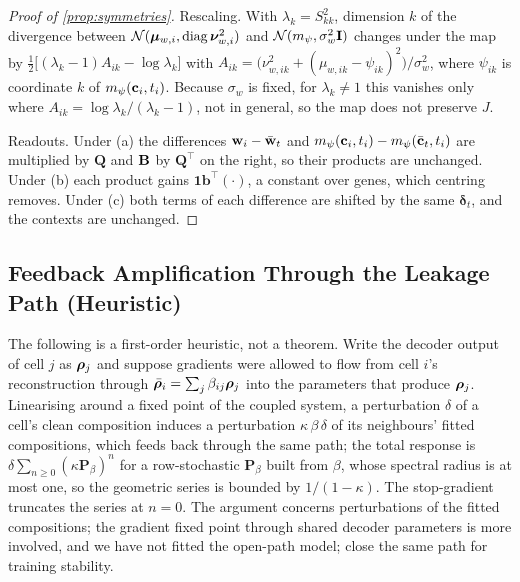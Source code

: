 \begin{proof}[Proof of \cref{prop:symmetries}]
Rescaling. With $\lambda_k = S_{kk}^2$, dimension $k$ of the divergence between $\mathcal{N}(\boldsymbol{\mu}_{w,i}, \operatorname{diag}\boldsymbol{\nu}_{w,i}^2)$ and $\mathcal{N}(m_{\psi}, \sigma_w^2\mathbf{I})$ changes under the map by $\tfrac12\big[(\lambda_k - 1)A_{ik} - \log\lambda_k\big]$ with $A_{ik} = \big(\nu_{w,ik}^2 + (\mu_{w,ik} - \psi_{ik})^2\big)/\sigma_w^2$, where $\psi_{ik}$ is coordinate $k$ of $m_{\psi}(\mathbf{c}_i, t_i)$. Because $\sigma_w$ is fixed, for $\lambda_k \neq 1$ this vanishes only where $A_{ik} = \log\lambda_k/(\lambda_k - 1)$, not in general, so the map does not preserve $J$.

Readouts. Under (a) the differences $\mathbf{w}_i - \bar{\mathbf{w}}_t$ and $m_{\psi}(\mathbf{c}_i, t_i) - m_{\psi}(\bar{\mathbf{c}}_t, t_i)$ are multiplied by $\mathbf{Q}$ and $\mathbf{B}$ by $\mathbf{Q}^\top$ on the right, so their products are unchanged. Under (b) each product gains $\mathbf{1}\mathbf{b}^\top(\cdot)$, a constant over genes, which centring removes. Under (c) both terms of each difference are shifted by the same $\boldsymbol{\delta}_t$, and the contexts are unchanged.
\end{proof}

\subsection{Feedback Amplification Through the Leakage Path (Heuristic)}
\label{app:amplification}

The following is a first-order heuristic, not a theorem. Write the decoder output of cell $j$ as $\boldsymbol{\rho}_j$ and suppose gradients were allowed to flow from cell $i$'s reconstruction through $\bar{\boldsymbol{\rho}}_i = \sum_j \beta_{ij}\boldsymbol{\rho}_j$ into the parameters that produce $\boldsymbol{\rho}_j$. Linearising around a fixed point of the coupled system, a perturbation $\delta$ of a cell's clean composition induces a perturbation $\kappa\,\beta\,\delta$ of its neighbours' fitted compositions, which feeds back through the same path; the total response is $\delta\sum_{n \ge 0}(\kappa \mathbf{P}_\beta)^n$ for a row-stochastic $\mathbf{P}_\beta$ built from $\beta$, whose spectral radius is at most one, so the geometric series is bounded by $1/(1-\kappa)$. The stop-gradient truncates the series at $n = 0$. The argument concerns perturbations of the fitted compositions; the gradient fixed point through shared decoder parameters is more involved, and we have not fitted the open-path model; \citet{ergen2025} close the same path for training stability.
